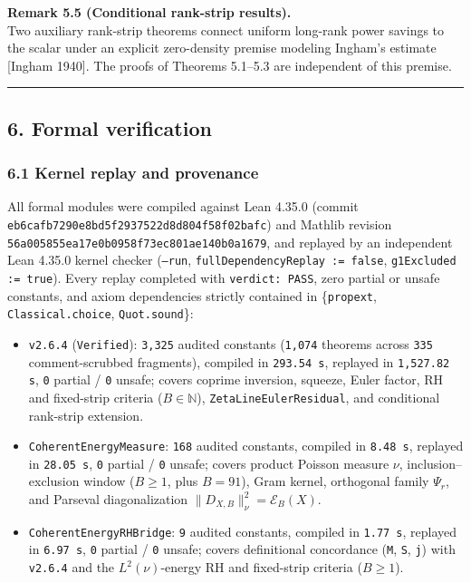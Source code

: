 \documentclass[11pt]{article}
\providecommand{\tightlist}{\setlength{\itemsep}{0pt}\setlength{\parskip}{0pt}}
\begin{document}
\textbf{Remark 5.5 (Conditional rank-strip results).}\\
Two auxiliary rank-strip theorems connect uniform long-rank power savings to the scalar under an explicit zero-density premise modeling Ingham's estimate {[}Ingham 1940{]}. The proofs of Theorems 5.1--5.3 are independent of this premise.

\begin{center}\rule{0.5\linewidth}{0.5pt}\end{center}

\subsection{6. Formal verification}\label{6-formal-verification}

\subsubsection{6.1 Kernel replay and provenance}\label{61-kernel-replay-and-provenance}

All formal modules were compiled against Lean 4.35.0 (commit \texttt{eb6cafb7290e8bd5f2937522d8d804f58f02bafc}) and Mathlib revision \texttt{56a005855ea17e0b0958f73ec801ae140b0a1679}, and replayed by an independent Lean 4.35.0 kernel checker (\texttt{--run}, \texttt{fullDependencyReplay := false}, \texttt{g1Excluded := true}). Every replay completed with \texttt{verdict: PASS}, zero partial or unsafe constants, and axiom dependencies strictly contained in \{\texttt{propext}, \texttt{Classical.choice}, \texttt{Quot.sound}\}:

\begin{itemize}
\tightlist
\item
  \texttt{v2.6.4} (\texttt{Verified}): \texttt{3,325} audited constants (\texttt{1,074} theorems across \texttt{335} comment-scrubbed fragments), compiled in \texttt{293.54 s}, replayed in \texttt{1,527.82 s}, \texttt{0} partial / \texttt{0} unsafe; covers coprime inversion, squeeze, Euler factor, RH and fixed-strip criteria (\(B \in \mathbb{N}\)), \texttt{ZetaLineEulerResidual}, and conditional rank-strip extension.
\item
  \texttt{CoherentEnergyMeasure}: \texttt{168} audited constants, compiled in \texttt{8.48 s}, replayed in \texttt{28.05 s}, \texttt{0} partial / \texttt{0} unsafe; covers product Poisson measure \(\nu\), inclusion--exclusion window (\(B \ge 1\), plus \(B = 91\)), Gram kernel, orthogonal family \(\Psi_r\), and Parseval diagonalization \(\|D_{X,B}\|_\nu^2 = \mathscr{E}_B(X)\).
\item
  \texttt{CoherentEnergyRHBridge}: \texttt{9} audited constants, compiled in \texttt{1.77 s}, replayed in \texttt{6.97 s}, \texttt{0} partial / \texttt{0} unsafe; covers definitional concordance (\texttt{M}, \texttt{S}, \texttt{j}) with \texttt{v2.6.4} and the \(L^2(\nu)\)-energy RH and fixed-strip criteria (\(B \ge 1\)).
\end{itemize}
\end{document}
